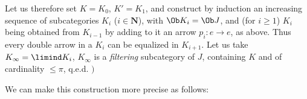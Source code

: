 Let us therefore set $K = K_0$, $K' = K_1$, and construct by induction an increasing sequence of subcategories $K_i$ ($i \in \mathbf{N}$), with $\Ob K_i = \Ob J$, and (for $i \geqslant 1$) $K_i$ being obtained from $K_{i-1}$ by adding to it an arrow $p_i : e \longrightarrow e$, as above. Thus every double arrow in a $K_i$ can be equalized in $K_{i+1}$. Let us take $K_\infty = \limind K_i$, $K_\infty$ is a \textit{filtering} subcategory of $J$, containing $K$ and of cardinality $\leqslant \pi$, q.e.d. $\Biggr)$

We can make this construction more precise as follows: